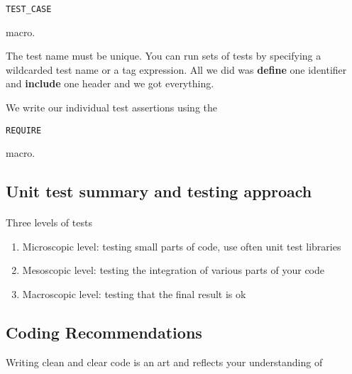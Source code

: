 \documentclass[%
oneside,                 %
final,                   %
10pt]{article}
\begin{document}
\begin{verbatim}
TEST_CASE 

\end{verbatim}

macro.

The test name must be unique. You can run sets of tests by specifying a wildcarded test name or a tag expression. 
All we did was \textbf{define} one identifier and \textbf{include} one header and we got everything.

We write our individual test assertions using the 


\begin{verbatim}
REQUIRE 

\end{verbatim}

macro.

\subsection*{Unit test summary and testing approach}

\paragraph{}
Three levels of tests
\begin{enumerate}
\item Microscopic level: testing small parts of code, use often unit test libraries

\item Mesoscopic level: testing the integration of various parts  of your code

\item Macroscopic level: testing that the final result is ok
\end{enumerate}

\noindent

 

\subsection*{Coding Recommendations}
Writing clean and clear code is an art and reflects 
your understanding of 
\end{document}
